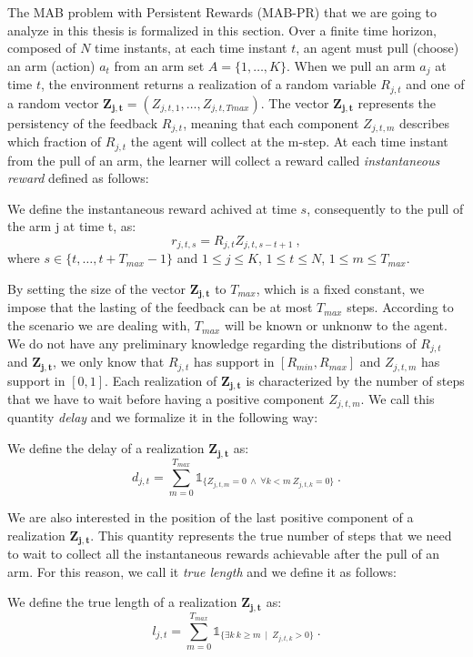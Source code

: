 The MAB problem with Persistent Rewards (MAB-PR) that we are going to analyze in this thesis is formalized in this section. Over a finite time horizon, composed of $N$ time instants, at each time instant $t$, an agent must pull (choose) an arm (action) $a_t$ from an arm set $A =\{1, \dots, K\} $. When we pull an arm $a_j$ at time $t$, the environment returns a realization of a random variable $R_{j,t}$ and one of a random vector $\boldsymbol{Z_{j,t}}= (Z_{j,t,1},\dots, Z_{j,t,Tmax})$. The vector $\boldsymbol{Z_{j,t}}$ represents the persistency of the feedback $R_{j,t}$, meaning that each component $Z_{j,t,m}$ describes which fraction of $R_{j,t}$ the agent will collect at the m-step. At each time instant from the pull of an arm, the learner will collect a reward called \emph{instantaneous reward} defined as follows:
\begin{definition}
	We define the instantaneous reward achived at time $s$, consequently to the pull of the arm j at time t, as:	
		$$r_{j,t,s} = R_{j,t} Z_{j,t,s-t+1} \ ,$$
where $s \in \{t,\dots,t+T_{max}-1\}$ and $1\leq j \leq K$, $1\leq t \leq N$, $1\leq m \leq T_{max}$.
\end{definition}
By setting the size of the vector $\boldsymbol{Z_{j,t}}$ to $T_{max}$, which is a fixed constant, we impose that the lasting of the feedback can be at most $T_{max}$ steps. According to the scenario we are dealing with, $T_{max}$ will be known or unknonw to the agent. We do not have any preliminary knowledge regarding the distributions of $R_{j,t}$ and $\boldsymbol{Z_{j,t}}$, we only know that $R_{j,t}$ has support in $[R_{min},R_{max}]$ and $Z_{j,t,m}$ has support in $[0,1]$. Each realization of $\boldsymbol{Z_{j,t}}$ is characterized by the number of steps that we have to wait before having a positive component $Z_{j,t,m}$. We call this quantity \emph{delay} and we formalize it in the following way:
\begin{definition}[Delay]
	We define the delay of a realization $\boldsymbol{Z_{j,t}}$ as:$$d_{j,t} = \sum_{m=0}^{T_{max}}\mathds{1}_{\{Z_{j,t,m}=0\ \wedge\ \forall k<m\ Z_{j,t,k} = 0\}}\ .$$

\end{definition}
We are also interested in the position of the last positive component of a realization $\boldsymbol{Z_{j,t}}$. This quantity represents the true number of steps that we need to wait to collect all the instantaneous rewards achievable after the pull of an arm. For this reason, we call it \emph{true length} and we define it as follows:
\begin{definition}
	We define the true length of a realization $\boldsymbol{Z_{j,t}}$ as:
		$$l_{j,t} = \sum_{m=0}^{T_{max}}\mathds{1}_{\{\exists k \ k\geq m \ \mid \ Z_{j,t,k} > 0\}} \ .$$
\end{definition}




